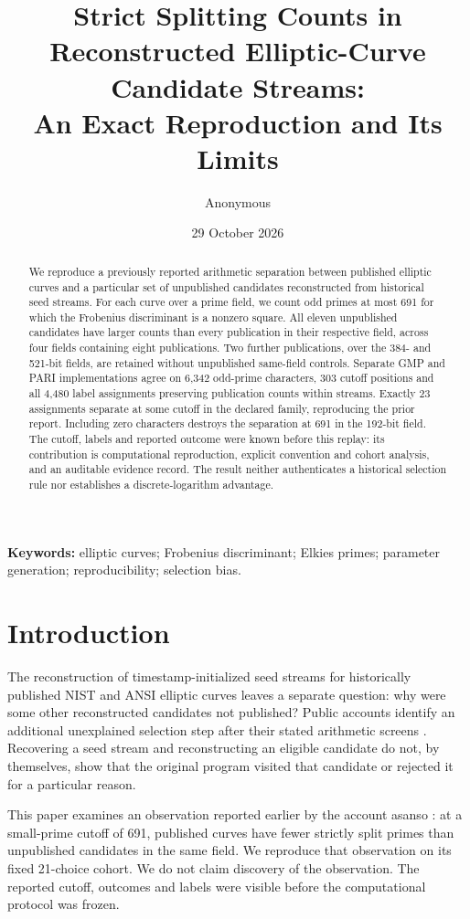 \documentclass[11pt]{article}
\title{Strict Splitting Counts in Reconstructed Elliptic-Curve Candidate Streams:\\
An Exact Reproduction and Its Limits}
\author{Anonymous}
\date{29 October 2026}
\begin{document}
\maketitle
\begin{abstract}
We reproduce a previously reported arithmetic separation between published
elliptic curves and a particular set of unpublished candidates reconstructed
from historical seed streams. For each curve over a prime field, we count odd
primes at most 691 for which the Frobenius discriminant is a nonzero square.
All eleven unpublished candidates have larger counts than every publication
in their respective field, across four fields containing eight publications.
Two further publications, over the 384- and 521-bit fields, are retained without
unpublished same-field controls. Separate GMP and PARI implementations agree
on 6,342 odd-prime characters, 303 cutoff positions and all 4,480 label
assignments preserving publication counts within streams. Exactly 23
assignments separate at some cutoff in the declared family, reproducing the
prior report. Including zero characters destroys the separation at 691 in the
192-bit field. The cutoff, labels and reported outcome were known before this
replay: its contribution is computational reproduction, explicit convention
and cohort analysis, and an auditable evidence record. The result neither
authenticates a historical selection rule nor establishes a discrete-logarithm
advantage.
\end{abstract}
\noindent\textbf{Keywords:} elliptic curves; Frobenius discriminant; Elkies primes;
parameter generation; reproducibility; selection bias.

\section{Introduction}
The reconstruction of timestamp-initialized seed streams for historically
published NIST and ANSI elliptic curves leaves a separate question: why were
some other reconstructed candidates not published? Public accounts identify
an additional unexplained selection step after their stated arithmetic
screens \cite{anthropic,valsorda}. Recovering a seed stream and reconstructing
an eligible candidate do not, by themselves, show that the original program
visited that candidate or rejected it for a particular reason.

This paper examines an observation reported earlier by the account
asanso \cite{asanso}: at a small-prime cutoff of 691, published curves have
fewer strictly split primes than unpublished candidates in the same field.
We reproduce that observation on its fixed 21-choice cohort. We do not claim
discovery of the observation. The reported cutoff, outcomes and labels were
visible before the computational protocol was frozen.
\end{document}
